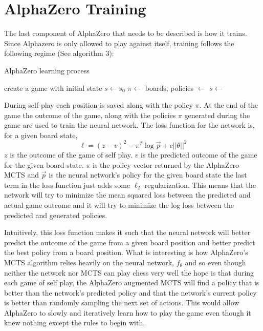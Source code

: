 \documentclass[letterpaper]{article} %
\begin{document}
  \section{AlphaZero Training}
  The last component of AlphaZero that needs to be described is how it trains.
  Since Alphazero is only allowed to play against itself, training follows the
  following regime (See algorithm $3$):
  \begin{algorithm}
  \caption{AlphaZero learning process}
  \begin{algorithmic}[1]
    \State create a game with initial state $s \gets s_0$
      \State $\pi \gets $
      \State boards, policies $\gets$ 
      \State $s \gets$ 
    \EndWhile
    \State {}
  \EndFunction
  \end{algorithmic}
  \end{algorithm}
  During self-play each position is saved along with the policy $\pi$. At the
  end of the game the outcome of the game, along with the policies $\pi$
  generated during the game are used to train the neural network. The loss
  function for the network is, for a given board state,
  \[\ell = (z-v)^2 - \pi^T\log \vec{p} + c||\theta||^2\]
  $z$ is the outcome of the game of self play. $v$ is the predicted outcome of
  the game for the given board state. $\pi$ is the policy vector returned by the
  AlphaZero MCTS and $\vec{p}$ is the neural network's policy for the given
  board state the last term in the loss function just adds some $\ell_2$
  regularization. This means that the network will try to minimize the mean
  squared loss between the predicted and actual game outcome and it will try to
  minimize the log loss between the predicted and generated policies.
  
  Intuitively, this loss function makes it such that the neural
  network will better predict the outcome of the game from a given board
  position and better predict the best policy from a board position. What is
  interesting is how AlphaZero's MCTS algorithm relies heavily on the neural
  network, $f_\theta$ and so even though neither the network nor MCTS can play
  chess very well the hope is that during each game of self play, the AlphaZero
  augmented MCTS will find a policy that is better than the network's predicted
  policy and that the network's current policy is better than randomly sampling
  the next set of actions. This would allow AlphaZero to slowly and iteratively
  learn how to play the game even though it knew nothing except the rules to
  begin with.
\end{document}
